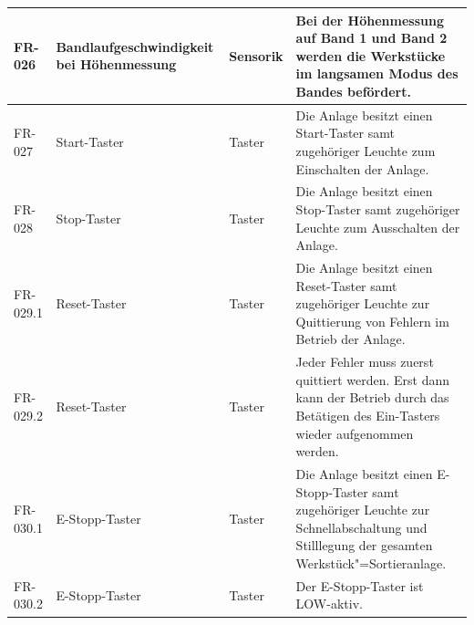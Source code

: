 \documentclass[oneside,a4paper,titlepage]{scrartcl} %
\begin{document}
\begin{small}
\begin{longtable}{|C{2cm}|L{4cm}|C{1.5cm}|L{5.5cm}|}
  \hline
   FR-026 & Bandlaufgeschwindigkeit bei Höhenmessung & Sensorik & Bei der Höhenmessung auf Band 1 und Band 2 werden die Werkstücke im langsamen Modus des Bandes befördert.\\
  \hline
  FR-027 & Start-Taster & Taster & Die Anlage besitzt einen Start-Taster samt zugehöriger Leuchte zum Einschalten der Anlage.\\
  \hline
   FR-028 & Stop-Taster & Taster & Die Anlage besitzt einen Stop-Taster samt zugehöriger Leuchte zum Ausschalten der Anlage.\\
  \hline
  FR-029.1 & Reset-Taster & Taster & Die Anlage besitzt einen Reset-Taster samt zugehöriger Leuchte zur Quittierung von Fehlern im Betrieb der Anlage.\\
  \hline
  FR-029.2 & Reset-Taster & Taster & Jeder Fehler muss zuerst quittiert werden. Erst dann kann der Betrieb durch das Betätigen des Ein-Tasters wieder aufgenommen werden.\\
  \hline
   FR-030.1 & E-Stopp-Taster & Taster & Die Anlage besitzt einen E-Stopp-Taster samt zugehöriger Leuchte zur Schnellabschaltung und Stilllegung der gesamten Werkstück"=Sortieranlage.\\
  \hline
   FR-030.2 & E-Stopp-Taster & Taster & Der E-Stopp-Taster ist LOW-aktiv.\\
  \hline
 \end{longtable}
\end{small}

\end{document}
